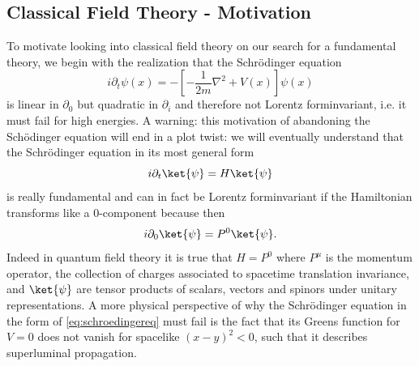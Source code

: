 \subsection{Classical Field Theory - Motivation}
To motivate looking into classical field theory on our search for a fundamental theory, we begin with the realization that the Schrödinger equation
\begin{equation}
\label{eq:schroedingereq}
	i\partial_t \psi(x) = - \left[- \frac{1}{2m} \nabla^2 + V(x)\right]\psi(x)
\end{equation}
is linear in $\partial_0$ but quadratic in $\partial_i$ and therefore not Lorentz forminvariant, i.e. it must fail for
high energies. A warning: this motivation of abandoning the Schödinger equation will end in a plot
twist: we will eventually understand that the Schrödinger equation in its most general form
\begin{equation}
i \partial_t \ket{\psi} = H \ket{\psi}
\end{equation}
is really fundamental and can in fact be Lorentz forminvariant if the Hamiltonian transforms like
a $0$-component because then
\begin{equation}
	i \partial_0 \ket{\psi} = P^0 \ket{\psi}.
\end{equation}
Indeed in quantum field theory it is true that $H = P^0$ where $P^\mu$ is the momentum operator, the
collection of charges associated to spacetime translation invariance, and $\ket{\psi}$ are tensor products
of scalars, vectors and spinors under unitary representations. A more physical perspective of why
the Schrödinger equation in the form of \ref{eq:schroedingereq} must fail is the fact that its Greens function for $V = 0$ does not vanish for spacelike $(x − y)^2 < 0$, such that it describes superluminal propagation.


